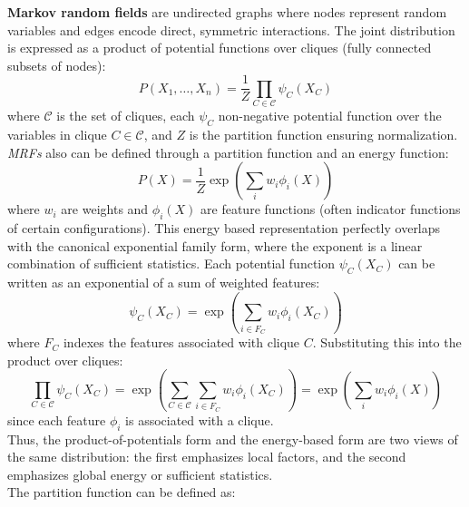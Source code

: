 \documentclass[encoding=utf8,british]{tumphthesis}
\begin{document}
            \textbf{Markov random fields} are undirected graphs where nodes represent random variables and edges encode direct, symmetric 
            interactions. The joint distribution is expressed as a product of potential functions over cliques (fully connected subsets of 
            nodes):
            \begin{equation}
                P(X_1, \ldots, X_n) = \frac{1}{Z} \prod_{C \in \mathcal{C}} \psi_C(X_C)
            \end{equation}
            where $\mathcal{C}$ is the set of cliques, each $\psi_C$ non-negative potential function over the variables in clique $C \in \mathcal{C}$, and $Z$ is the partition function 
            ensuring normalization. \textit{MRFs} also can be defined through a partition function and an energy function:
            \begin{equation}
                P(X) = \frac{1}{Z} \exp \left( \sum_i w_i \phi_i (X) \right)
                \label{eq:MLN_energy}
            \end{equation}
            where $w_i$ are weights and $\phi_i(X)$ are feature functions (often indicator functions of certain configurations).
            This energy based representation perfectly overlaps with the canonical exponential family form, where the exponent is a linear combination of sufficient statistics.
            Each potential function $\psi_C(X_C)$ can be written as an exponential of a sum of weighted features:
            \begin{equation*}
                \psi_C(X_C) = \exp \left( \sum_{i \in F_C} w_i \phi_i (X_C) \right)
            \end{equation*}
            where $F_C$ indexes the features associated with clique $C$. Substituting this into the product over cliques:
            \begin{equation*}
                \prod_{C \in \mathcal{C}} \psi_C(X_C) = \exp \left( \sum_{C \in \mathcal{C}} \sum_{i \in F_C} w_i \phi_i (X_C) \right) = \exp \left( \sum_i w_i \phi_i (X) \right)
            \end{equation*}
            since each feature $\phi_i$ is associated with a clique.
            \\
            Thus, the product-of-potentials form and the energy-based form are two views of the same distribution: 
            the first emphasizes local factors, and the second emphasizes global energy or sufficient statistics.
            \\
            The partition function can be defined as:
\end{document}
